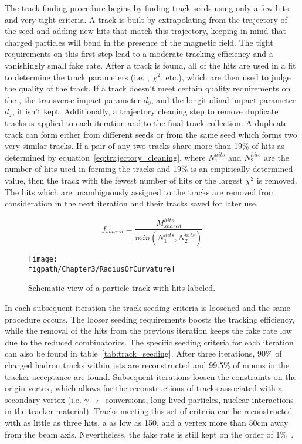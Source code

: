 The track finding procedure begins by finding track seeds using only a few hits and very tight criteria.
A track is built by extrapolating from the trajectory of the seed and adding new hits that match this trajectory, keeping in mind that charged particles will bend in the presence of the magnetic field.
The tight requirements on this first step lead to a moderate tracking efficiency and a vanishingly small fake rate.
After a track is found, all of the hits are used in a fit to determine the track parameters (i.e. \pt, $\chi^{2}$, etc.), which are then used to judge the quality of the track.
If a track doesn't meet certain quality requirements on the \pt, the transverse impact parameter $d_{0}$, and the longitudinal impact parameter $d_{z}$, it isn't kept.
Additionally, a trajectory cleaning step to remove duplicate tracks is applied to each iteration and to the final track collection.
A duplicate track can form either from different seeds or from the same seed which forms two very similar tracks.
If a pair of any two tracks share more than 19\% of hits as determined by equation~\ref{eq:trajectory_cleaning}, where $N^{hits}_{1}$ and $N^{hits}_{2}$ are the number of hits used in forming the tracks and 19\% is an empirically determined value, then the track with the fewest number of hits or the largest $\chi^{2}$ is removed.
The hits which are unambiguously assigned to the tracks are removed from consideration in the next iteration and their tracks saved for later use.

\begin{equation}
\label{eq:trajectory_cleaning}
f_{shared}=\frac{M^{hits}_{shared}}{min\left(N^{hits}_{1},N^{hits}_{2}\right)}
\end{equation}

\begin{figure}[!hbt]
    \centering
    \texttt{[image: \\figpath/Chapter3/RadiusOfCurvature]}
    \caption{Schematic view of a particle track with hits labeled.}
    \label{fig:radius_of_curvature}
\end{figure}

In each subsequent iteration the track seeding criteria is loosened and the same procedure occurs.
The looser seeding requirements boosts the tracking efficiency, while the removal of the hits from the previous iteration keeps the fake rate low due to the reduced combinatorics.
The specific seeding criteria for each iteration can also be found in table~\ref{tab:track_seeding}.
After three iterations, 90\% of charged hadron tracks within jets are reconstructed and 99.5\% of muons in the tracker acceptance are found.
Subsequent iterations loosen the constraints on the origin vertex, which allows for the reconstructions of tracks associated with a secondary vertex (i.e. $\gamma\rightarrow$\Pep\Pem~conversions, long-lived particles, nuclear interactions in the tracker material).
Tracks meeting this set of criteria can be reconstructed with as little as three hits, a \pt as low as 150\mev, and a vertex  more than 50\unit{cm} away from the beam axis.
Nevertheless, the fake rate is still kept on the order of 1\%~\cite{CMS-PAS-PFT-09-001}.

